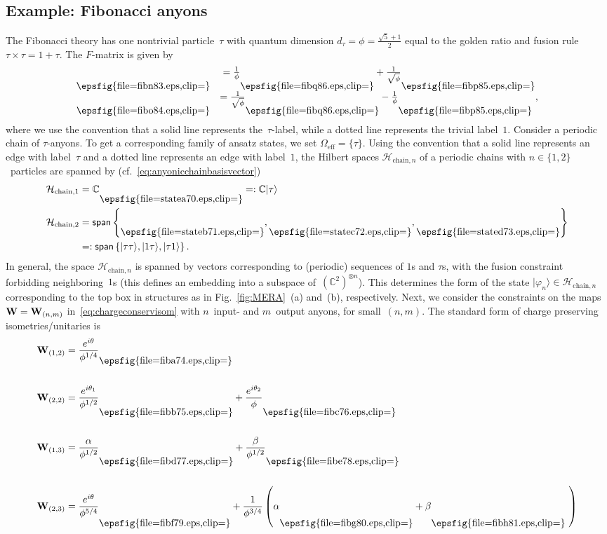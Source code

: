 \documentclass[floats,prb,twocolumn]{revtex4}
\newcommand*{\textfrac}[2]{{{#1}/{#2}}}
\newcommand*{\cH}{\mathcal{H}}
\newcommand{\ket}[1]{|#1\rangle}
\newcommand*{\Xisometry}{{\bf W}}
\newcommand*{\statea}{\raisebox{-9.780pt}{\epsfig{file=statea70.eps,clip=}}}
\newcommand*{\stateb}{\raisebox{-9.780pt}{\epsfig{file=stateb71.eps,clip=}}}
\newcommand*{\statec}{\raisebox{-9.780pt}{\epsfig{file=statec72.eps,clip=}}}
\newcommand*{\stated}{\raisebox{-9.780pt}{\epsfig{file=stated73.eps,clip=}}}
\newcommand*{\fiba}{\raisebox{-10.503pt}{\epsfig{file=fiba74.eps,clip=}}}
\newcommand*{\fibb}{\raisebox{-14.763pt}{\epsfig{file=fibb75.eps,clip=}}}
\newcommand*{\fibc}{\raisebox{-14.763pt}{\epsfig{file=fibc76.eps,clip=}}}
\newcommand*{\fibd}{\raisebox{-14.043pt}{\epsfig{file=fibd77.eps,clip=}}}
\newcommand*{\fibe}{\raisebox{-14.043pt}{\epsfig{file=fibe78.eps,clip=}}}
\newcommand*{\fibf}{\raisebox{-17.226pt}{\epsfig{file=fibf79.eps,clip=}}}
\newcommand*{\fibg}{\raisebox{-17.226pt}{\epsfig{file=fibg80.eps,clip=}}}
\newcommand*{\fibh}{\raisebox{-17.226pt}{\epsfig{file=fibh81.eps,clip=}}}
\newcommand*{\fibn}{\raisebox{-14.043pt}{\epsfig{file=fibn83.eps,clip=}}}
\newcommand*{\fibo}{\raisebox{-14.043pt}{\epsfig{file=fibo84.eps,clip=}}}
\newcommand*{\fibp}{\raisebox{-14.043pt}{\epsfig{file=fibp85.eps,clip=}}}
\newcommand*{\fibq}{\raisebox{-14.043pt}{\epsfig{file=fibq86.eps,clip=}}}
\begin{document}
\subsection{Example:  Fibonacci anyons} 
The Fibonacci theory has one nontrivial particle~$\tau$ with quantum dimension $d_\tau=\phi=\frac{\sqrt{5}+1}{2}$ equal to the golden ratio and fusion rule $\tau\times\tau=1+\tau$. The $F$-matrix is given by
\begin{align}
\begin{matrix}
\fibn&=\frac{1}{\phi}\fibq+\frac{1}{\sqrt{\phi}}\fibp\\
\fibo&=\frac{1}{\sqrt{\phi}}\fibq-\frac{1}{\phi}\fibp\ ,
\end{matrix}\label{eq:fmatrixfib}
\end{align}
where we use the convention that a solid line represents the~$\tau$-label, while a dotted line represents the trivial label~$1$. 
Consider a periodic chain of $\tau$-anyons. To get a corresponding family of ansatz states, we set $\Omega_{\textrm{eff}}=\{\tau\}$. Using the convention that a solid line represents an edge with label~$\tau$ and a dotted line represents an edge with label~$1$, the Hilbert spaces $\cH_{\textrm{chain},n}$ of a periodic chains with $n\in\{1,2\}$~particles are spanned by (cf.~\eqref{eq:anyonicchainbasisvector})
\begin{align}
\cH_{\textrm{chain},1}&=\mathbb{C}\statea=:\mathbb{C}\ket{\tau}\label{eq:chainonefib}\\
\cH_{\textrm{chain},2}&=\textsf{span}\left\{\stateb,\statec,\stated\right\}\nonumber\\
&=:\textsf{span}\left\{\ket{\tau\tau},\ket{1\tau},\ket{\tau 1}\right\} .\nonumber\end{align} 
In general, the space $\cH_{\textrm{chain},n}$ is spanned by vectors corresponding to (periodic) sequences  of $1$s and $\tau$s, with the fusion constraint forbidding neighboring~$1$s (this defines an embedding into a subspace of~$(\mathbb{C}^2)^{\otimes n}$). This determines the form of the state $\ket{\varphi_{n}}\in\cH_{\textrm{chain},n}$ corresponding to the top box in structures as in Fig.~\ref{fig:MERA}~(a) and~(b), respectively. Next, we consider the constraints on the maps $\Xisometry=\Xisometry_{(n,m)}$ in~\eqref{eq:chargeconservisom} with $n$~input- and $m$~output anyons, for small~$(n,m)$.  The standard form of  charge preserving isometries/unitaries  is
\begin{align}
\hspace{-3ex}\Xisometry_{(1,2)} &=\frac{e^{i\theta}}{\phi^{1/4}}\fiba\label{eq:wonetwo}\\
\nonumber\\
\Xisometry_{(2,2)} &=\frac{e^{i\theta_1}}{\phi^{\textfrac{1}{2}}}\fibb+\frac{e^{i\theta_2}}{\phi}\fibc\label{eq:wtwotwo}\\
\nonumber\\
\Xisometry_{(1,3)} &=\frac{\alpha}{\phi^{\textfrac{1}{2}}}\fibd+\frac{\beta}{\phi^{\textfrac{1}{2}}}\fibe\label{eq:wonethree}\\
\nonumber\\
\Xisometry_{(2,3)} &=\frac{e^{i\theta}}{\phi^{\textfrac{5}{4}}}\fibf+\frac{1}{\phi^{3/4}}\left(\alpha\fibg+\beta\fibh\ \right)\label{eq:wtwothree}
\end{align} 
\end{document}
